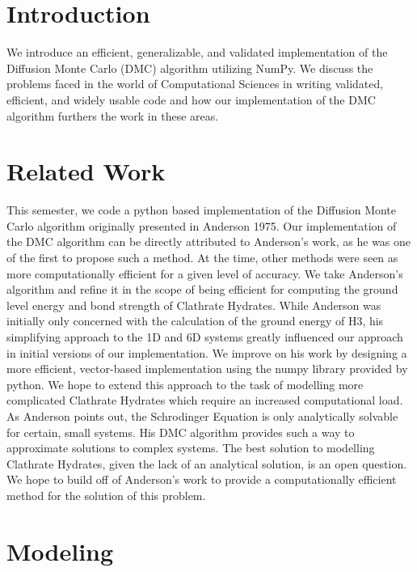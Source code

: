 \documentclass[journal=jacsat,manuscript=article]{achemso}
\begin{document}
\section{Introduction}
We introduce an efficient, generalizable, and validated implementation of the Diffusion Monte Carlo (DMC) algorithm utilizing NumPy. We discuss the problems faced in the world of Computational Sciences in writing validated, efficient, and widely usable code and how our implementation of the DMC algorithm furthers the work in these areas. 
\section{Related Work}

This semester, we code a python based implementation of the Diffusion Monte Carlo algorithm originally presented in Anderson 1975. Our implementation of the DMC algorithm can be directly attributed to Anderson's work, as he was one of the first to propose such a method. At the time, other methods were seen as more computationally efficient for a given level of accuracy. We take Anderson's algorithm and refine it in the scope of being efficient for computing the ground level energy and bond strength of Clathrate Hydrates. 
While Anderson was initially only concerned with the calculation of the ground energy of H3, his simplifying approach to the 1D and 6D systems greatly influenced our approach in initial versions of our implementation. We improve on his work by designing a more efficient, vector-based implementation using the numpy library provided by python. We hope to extend this approach to the task of modelling more complicated Clathrate Hydrates which require an increased computational load.
As Anderson points out, the Schrodinger Equation is only analytically solvable for certain, small systems. His DMC algorithm provides such a way to approximate solutions to complex systems. The best solution to modelling Clathrate Hydrates, given the lack of an analytical solution, is an open question. We hope to build off of Anderson's work to provide a computationally efficient method for the solution of this problem.


\section{Modeling}
\end{document}
